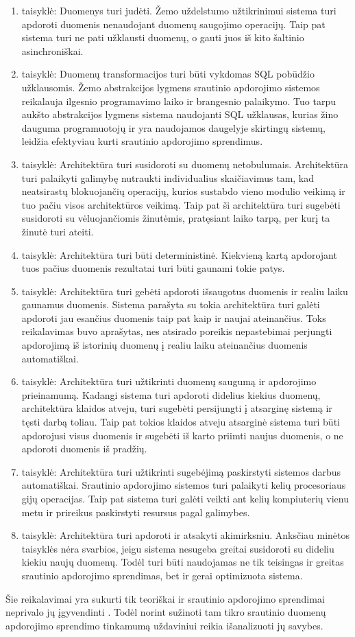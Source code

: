 \documentclass{VUMIFPSbakalaurinis}
\begin{document}
\begin{enumerate}[label=\arabic*]
    \item taisyklė: Duomenys turi judėti. Žemo uždelstumo užtikrinimui sistema turi apdoroti duomenis nenaudojant duomenų saugojimo operacijų. 
    Taip pat sistema turi ne pati užklausti duomenų, o gauti juos iš kito šaltinio asinchroniškai. 
    \item taisyklė: Duomenų transformacijos turi būti vykdomas SQL pobūdžio užklausomis. Žemo abstrakcijos lygmens srautinio apdorojimo sistemos reikalauja ilgesnio programavimo laiko ir brangesnio palaikymo. Tuo tarpu aukšto abstrakcijos lygmens sistema naudojanti SQL užklausas, kurias žino dauguma programuotojų ir yra naudojamos daugelyje skirtingų sistemų, leidžia efektyviau kurti srautinio apdorojimo sprendimus.
    \item taisyklė: Architektūra turi susidoroti su duomenų netobulumais. Architektūra turi palaikyti galimybę nutraukti individualius skaičiavimus tam, kad neatsirastų blokuojančių operacijų, kurios sustabdo vieno modulio veikimą ir tuo pačiu visos architektūros veikimą. Taip pat ši architektūra turi sugebėti susidoroti su vėluojančiomis žinutėmis, pratęsiant laiko tarpą, per kurį ta žinutė turi ateiti.
    \item taisyklė: Architektūra turi būti deterministinė. Kiekvieną kartą apdorojant tuos pačius duomenis rezultatai turi būti gaunami tokie patys.
    \item taisyklė: Architektūra turi gebėti apdoroti išsaugotus duomenis ir realiu laiku gaunamus duomenis. Sistema parašyta su tokia architektūra turi galėti apdoroti jau esančius duomenis taip pat kaip ir naujai ateinančius. Toks reikalavimas buvo aprašytas, nes atsirado poreikis nepastebimai perjungti apdorojimą iš istorinių duomenų į realiu laiku ateinančius duomenis automatiškai.
    \item taisyklė: Architektūra turi užtikrinti duomenų saugumą ir apdorojimo prieinamumą. Kadangi sistema turi apdoroti didelius kiekius duomenų, architektūra klaidos atveju, turi sugebėti persijungti į atsarginę sistemą ir tęsti darbą toliau. Taip pat tokios klaidos atveju atsarginė sistema turi būti apdorojusi visus duomenis ir sugebėti iš karto priimti naujus duomenis, o ne apdoroti duomenis iš pradžių.
    \item taisyklė: Architektūra turi užtikrinti sugebėjimą paskirstyti sistemos darbus automatiškai. Srautinio apdorojimo sistemos turi palaikyti kelių procesoriaus gijų operacijas. Taip pat sistema turi galėti veikti ant kelių kompiuterių vienu metu ir prireikus paskirstyti resursus pagal galimybes.
    \item taisyklė: Architektūra turi apdoroti ir atsakyti akimirksniu. Anksčiau minėtos taisyklės nėra svarbios, jeigu sistema nesugeba greitai susidoroti su dideliu kiekiu naujų duomenų. Todėl turi būti naudojamas ne tik teisingas ir greitas srautinio apdorojimo sprendimas, bet ir gerai optimizuota sistema.
\end{enumerate}\par 
Šie reikalavimai yra sukurti tik teoriškai ir srautinio apdorojimo sprendimai neprivalo jų įgyvendinti \cite{stonebraker20058}. 
Todėl norint sužinoti tam tikro srautinio duomenų apdorojimo sprendimo tinkamumą uždaviniui reikia išanalizuoti jų savybes.   
\end{document}
